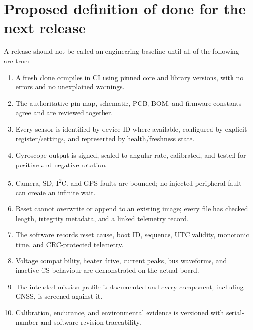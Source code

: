 \documentclass[11pt,a4paper]{article}
\begin{document}
\section{Proposed definition of done for the next release}

A release should not be called an engineering baseline until all of the following are true:

\begin{enumerate}
  \item A fresh clone compiles in CI using pinned core and library versions, with no errors and no unexplained warnings.
  \item The authoritative pin map, schematic, PCB, BOM, and firmware constants agree and are reviewed together.
  \item Every sensor is identified by device ID where available, configured by explicit register/settings, and represented by health/freshness state.
  \item Gyroscope output is signed, scaled to angular rate, calibrated, and tested for positive and negative rotation.
  \item Camera, SD, I\textsuperscript{2}C, and GPS faults are bounded; no injected peripheral fault can create an infinite wait.
  \item Reset cannot overwrite or append to an existing image; every file has checked length, integrity metadata, and a linked telemetry record.
  \item The software records reset cause, boot ID, sequence, UTC validity, monotonic time, and CRC-protected telemetry.
  \item Voltage compatibility, heater drive, current peaks, bus waveforms, and inactive-CS behaviour are demonstrated on the actual board.
  \item The intended mission profile is documented and every component, including GNSS, is screened against it.
  \item Calibration, endurance, and environmental evidence is versioned with serial-number and software-revision traceability.
\end{enumerate}
\end{document}
